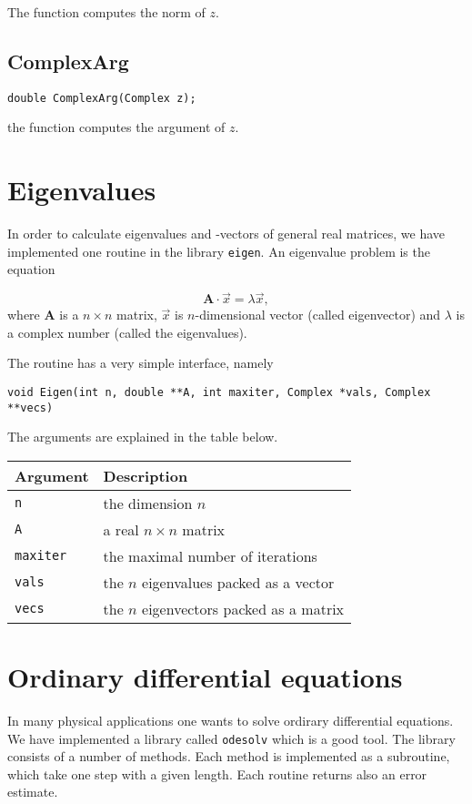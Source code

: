 \documentclass[12pt]{article}
\begin{document}
The function computes the norm of $z$.


\subsection{ComplexArg}
\label{sec:ComplexArg}
\begin{verbatim}
double ComplexArg(Complex z);
\end{verbatim}

the function computes the argument of $z$.


\section{Eigenvalues}
\label{sec:Eigen}
In order to calculate eigenvalues and -vectors of general real
matrices, we have implemented one routine in the library {\tt eigen}.
An eigenvalue problem is the equation

\begin{equation}
{\mathbf A}\cdot\vec{x} = \lambda\vec{x},
\label{EigenEq}
\end{equation}
where ${\mathbf A}$ is a $n\times n$ matrix, $\vec{x}$ is
$n$-dimensional vector (called eigenvector) and $\lambda$ is a
complex number (called the eigenvalues). 

The routine has a very simple interface, namely

\begin{verbatim}
void Eigen(int n, double **A, int maxiter, Complex *vals, Complex
**vecs)
\end{verbatim}

The arguments are explained in the table below.

\begin{center}
  \begin{tabular}{|l|l|}
    \hline
    Argument       & Description \\ \hline
    {\tt n}        & the dimension $n$ \\
    {\tt A}        & a real $n\times n$ matrix \\
    {\tt maxiter}  & the maximal number of iterations \\
    {\tt vals}     & the $n$ eigenvalues packed as a vector \\
    {\tt vecs}     & the $n$ eigenvectors packed as a matrix \\ \hline
  \end{tabular}
\end{center}


\section{Ordinary differential equations}
\label{sec:ODEs}
In many physical applications one wants to solve ordirary differential
equations. We have implemented a library called {\tt odesolv} which is
a good tool. The library consists of a number of methods. Each method
is implemented as a subroutine, which take one step with a given
length. Each routine returns also an error estimate.
\end{document}
